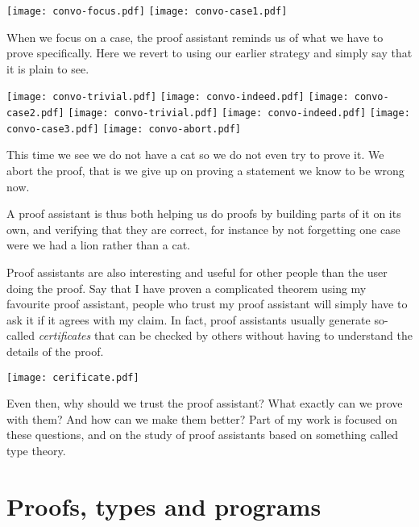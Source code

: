 \begin{center}
  \texttt{[image: convo-focus.pdf]}
  \texttt{[image: convo-case1.pdf]}
\end{center}

When we focus on a case, the proof assistant reminds us of what we have to prove
specifically. Here we revert to using our earlier strategy and simply say that
it is plain to see.

\begin{center}
  \texttt{[image: convo-trivial.pdf]}
  \texttt{[image: convo-indeed.pdf]}
  \texttt{[image: convo-case2.pdf]}
  \texttt{[image: convo-trivial.pdf]}
  \texttt{[image: convo-indeed.pdf]}
  \texttt{[image: convo-case3.pdf]}
  \texttt{[image: convo-abort.pdf]}
\end{center}

This time we see we do not have a cat so we do not even try to prove it.
We abort the proof, that is we give up on proving a statement we know to be
wrong now.

A proof assistant is thus both helping us do proofs by building parts of it on
its own, and verifying that they are correct, for instance by not forgetting one
case were we had a lion rather than a cat.

Proof assistants are also interesting and useful for other people than the user
doing the proof. Say that I have proven a complicated theorem using my favourite
proof assistant, people who trust my proof assistant will simply have to ask it
if it agrees with my claim.
In fact, proof assistants usually generate so-called \emph{certificates} that
can be checked by others without having to understand the details of the proof.
\begin{center}
  \texttt{[image: cerificate.pdf]}
\end{center}

Even then, why should we trust the proof assistant? What exactly can we prove
with them? And how can we make them better?
Part of my work is focused on these questions, and on the study of proof
assistants based on something called type theory.

\section{Proofs, types and programs}


